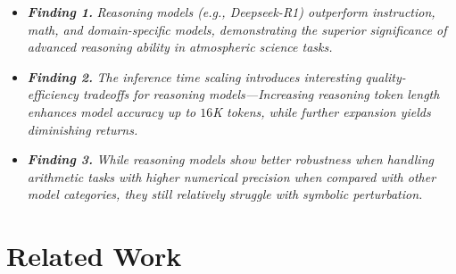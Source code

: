 \begin{itemize}[topsep=5pt, leftmargin=1em]
\vspace{-0.5em}
\item \textit{\textbf{Finding 1.}} \textit{Reasoning models (e.g., Deepseek-R1) outperform instruction, math, and domain-specific models, demonstrating the superior significance of advanced reasoning ability in atmospheric science tasks.}

\vspace{-0.35em}
\item \textit{\textbf{Finding 2.}} \textit{The inference time scaling introduces interesting quality-efficiency tradeoffs for reasoning models---Increasing reasoning token length enhances model accuracy up to $16$K tokens, while further expansion yields diminishing returns.}

\vspace{-0.35em}

\item \textit{\textbf{Finding 3.}} \textit{While reasoning models show better robustness when handling arithmetic tasks with higher numerical precision when compared with other model categories, they still relatively struggle with symbolic perturbation.}

\vspace{-0.5em}

\end{itemize}


\section{Related Work}

